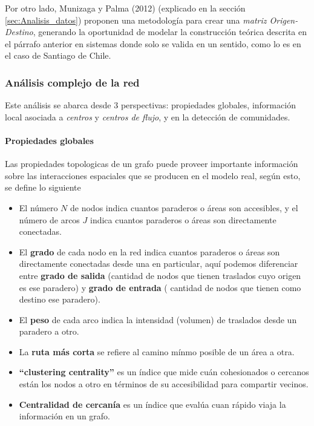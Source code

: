 \documentclass[12pt]{article}
\begin{document}
	Por otro lado, Munizaga y Palma (2012) \cite{Procesamiento_datos} (explicado en la sección \ref{sec:Analisis_datos}) proponen una metodología para crear una \textit{matriz Origen-Destino}, generando la oportunidad de modelar la construcción teórica descrita en el párrafo anterior en sistemas donde solo se valida en un sentido, como lo es en el caso de Santiago de Chile.
	
	\subsubsection{Análisis complejo de la red}    

Este análisis se abarca desde 3 perspectivas: propiedades globales, información local asociada a \textit{centros} y \textit{centros de flujo}, y en la detección de comunidades. 

	\paragraph{Propiedades globales}

Las propiedades topologicas de un grafo puede proveer importante información sobre las interacciones espaciales que se producen en el modelo real, según esto, se define lo siguiente

	\begin{itemize}
	
		\item El número $N$ de nodos indica cuantos paraderos o áreas son accesibles, y el número de arcos $J$ indica cuantos paraderos o áreas son directamente conectadas.
		\item El \textbf{grado} de cada nodo en la red indica cuantos paraderos o áreas son directamente conectadas desde una en particular, aquí podemos diferenciar entre \textbf{grado de salida} (cantidad de nodos que tienen traslados cuyo origen es ese paradero) y \textbf{grado de entrada} ( cantidad de nodos que tienen como destino ese paradero).
		
		\item El \textbf{peso} de cada arco indica la intensidad (volumen) de traslados desde un paradero a otro.
		
		\item La \textbf{ruta más corta} se refiere al camino mínmo posible de un área a otra.
		
		\item \textbf{``clustering centrality''} es un índice que mide cuán cohesionados o cercanos están los nodos a otro en términos de su accesibilidad para compartir vecinos.

		
		\item \textbf{Centralidad de cercanía} es un índice que evalúa cuan rápido viaja la información en un grafo.

	\end{itemize}
\end{document}
